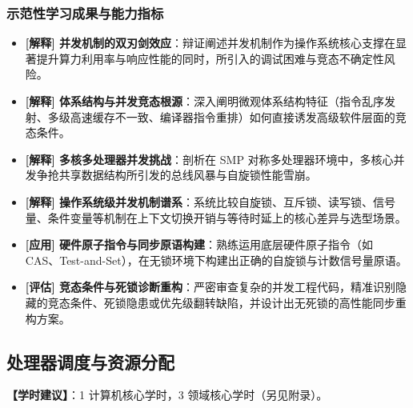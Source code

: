 \subsubsection{示范性学习成果与能力指标}
\begin{itemize}\setlength{\itemsep}{0pt}\setlength{\parskip}{0pt}
    \item \textbf{[解释] 并发机制的双刃剑效应}：辩证阐述并发机制作为操作系统核心支撑在显著提升算力利用率与响应性能的同时，所引入的调试困难与竞态不确定性风险。
    \item \textbf{[解释] 体系结构与并发竞态根源}：深入阐明微观体系结构特征（指令乱序发射、多级高速缓存不一致、编译器指令重排）如何直接诱发高级软件层面的竞态条件。
    \item \textbf{[解释] 多核多处理器并发挑战}：剖析在 SMP 对称多处理器环境中，多核心并发争抢共享数据结构所引发的总线风暴与自旋锁性能雪崩。
    \item \textbf{[解释] 操作系统级并发机制谱系}：系统比较自旋锁、互斥锁、读写锁、信号量、条件变量等机制在上下文切换开销与等待时延上的核心差异与选型场景。
    \item \textbf{[应用] 硬件原子指令与同步原语构建}：熟练运用底层硬件原子指令（如 CAS、Test-and-Set），在无锁环境下构建出正确的自旋锁与计数信号量原语。
    \item \textbf{[评估] 竞态条件与死锁诊断重构}：严密审查复杂的并发工程代码，精准识别隐藏的竞态条件、死锁隐患或优先级翻转缺陷，并设计出无死锁的高性能同步重构方案。
\end{itemize}

\subsection{处理器调度与资源分配}
\textbf{【学时建议】}：1 计算机核心学时，3 领域核心学时（另见附录）。

